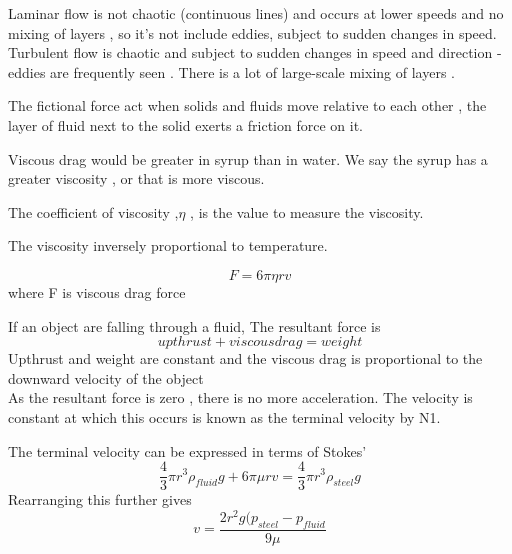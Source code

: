 \documentclass[a4paper]{article}
\begin{document}
\begin{defi}
Laminar flow is not chaotic (continuous lines) and occurs at lower speeds and no mixing of layers , so it's not include eddies, subject to sudden changes in speed.\\

Turbulent flow is chaotic and subject to sudden changes in speed and direction - eddies are frequently seen . There is a lot of large-scale mixing of layers .
\end{defi}

\begin{defi}
The fictional force act when solids and fluids move relative to each other , the layer of fluid next to the solid exerts a friction force on it.
\end{defi}
\begin{defi}[Viscosity]
Viscous drag would be greater in syrup than in water. We say the syrup has a greater viscosity , or that is more viscous.\

The coefficient of viscosity ,$\eta$ , is the value to measure the viscosity.
\end{defi}

\begin{prop}
The viscosity inversely proportional to temperature.
\end{prop}



\begin{law}
  \begin{equation*}
      F=6\pi\eta rv
  \end{equation*}
  where F is viscous drag force
\end{law}
\begin{defi}
If an object are falling through a fluid, The resultant force is
\begin{equation*}
    upthrust+viscous drag=weight
\end{equation*}
Upthrust and weight are constant and the viscous drag is proportional to the downward velocity of the object\\

As the resultant force is zero , there is no more acceleration. The velocity is constant at which this occurs is known as the terminal velocity by N1.
\end{defi}

\begin{prop}
The terminal velocity can be expressed in terms of Stokes' \begin{equation*}
    \frac{4}{3}\pi r^3\rho_{fluid}g+6\pi\mu rv=\frac{4}{3}\pi r^3\rho_{steel}g
\end{equation*}
Rearranging this further gives
\begin{equation*}
    v=\frac{2r^2g(p_{steel}-p_{fluid}}{9\mu}
\end{equation*}
\end{prop}
\end{document}
